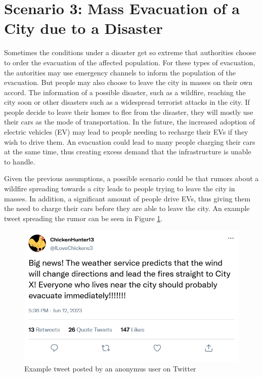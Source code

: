 \section{Scenario 3: Mass Evacuation of a City due to a Disaster}
\label{scenario3all}

Sometimes the conditions under a disaster get so extreme that 
authorities choose to order the evacuation of the affected population.
For these types of evacuation, the autorities may use emergency channels 
to inform the population of the evacuation.
But people may also choose to leave the city in masses on their own accord.
The information of a possible disaster, such as a wildfire, reaching the
city soon or other disasters such as a widespread terrorist attacks 
in the city.
If people decide to leave their homes to flee from the disaster, they 
will mostly use their cars as the mode of transportation.
In the future, the increased adoption of electric vehicles (EV)
may lead to people needing to recharge their EVs if they wish 
to drive them. An evacuation could lead to many people charging
their cars at the same time, thus creating excess demand that 
the infrastructure is unable to handle. 

Given the previous assumptions, a possible scenario could be that 
rumors about a wildfire spreading towards a city leads to people
trying to leave the city in masses. In addition, a significant 
amount of people drive EVs, thus giving them the need to charge
their cars before they are able to leave the city. An example
tweet spreading the rumor can be seen in Figure \ref{firetweet}.


\begin{figure}[!ht]
    \center
    \includegraphics[scale=.4]{figs/firenews.png}
    \caption{Example tweet posted by an anonymus user on Twitter}
    \label{firetweet}
\end{figure}

